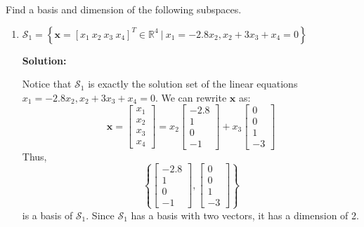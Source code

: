 Find a basis and dimension of the following subspaces.
\begin{enumerate}[label=(\alph*)]
	\item $\mathcal{S}_1 = \left\{ \mathbf{x} =
		      \left[ x_1 \ x_2 \ x_3 \ x_4 \right]^T
		      \in \mathbb{R}^4 \ | \
		      x_1 = -2.8x_2, x_2 + 3x_3 + x_4 = 0
		      \right\}$
	      \begin{tcolorbox}
		      \textbf{Solution:} \par
		      Notice that $\mathcal{S}_1$ is exactly the solution set of the
		      linear equations $x_1 = -2.8x_2, x_2 + 3x_3 + x_4 = 0$. We can
		      rewrite $\mathbf{x}$ as:
		      $$
			      \mathbf{x} =
			      \begin{bmatrix}
				      x_1 \\
				      x_2 \\
				      x_3 \\
				      x_4
			      \end{bmatrix} =
			      x_{2}
			      \begin{bmatrix}
				      -2.8 \\
				      1    \\
				      0    \\
				      -1
			      \end{bmatrix} +
			      x_{3}
			      \begin{bmatrix}
				      0 \\
				      0 \\
				      1 \\
				      -3
			      \end{bmatrix}
		      $$
		      Thus,
		      $$
			      \left\{
			      \begin{bmatrix}
				      -2.8 \\
				      1    \\
				      0    \\
				      -1
			      \end{bmatrix},
			      \begin{bmatrix}
				      0 \\
				      0 \\
				      1 \\
				      -3
			      \end{bmatrix}
			      \right\}
		      $$
		      is a basis of $\mathcal{S}_1$. Since $\mathcal{S}_1$ has a basis
		      with two vectors, it has a dimension of 2.

	      \end{tcolorbox}


\end{enumerate}
